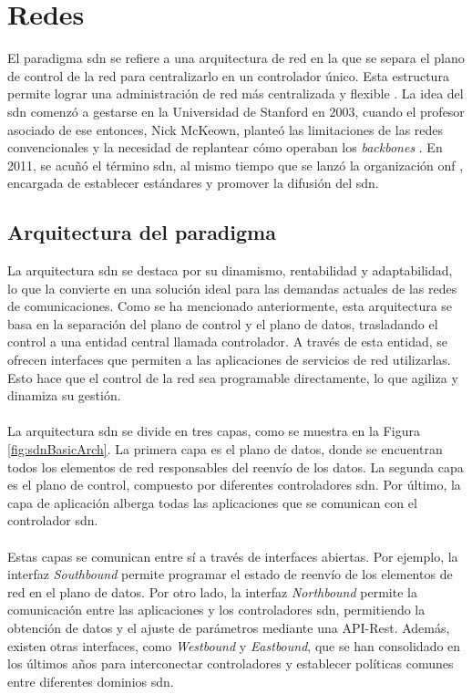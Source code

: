 \section{Redes  }
\label{sec:sdn}


El paradigma \gls{sdn} \cite{nadeau2013sdn} se refiere a una arquitectura de red en la que se separa el plano de control de la red para centralizarlo en un controlador único. Esta estructura permite lograr una administración de red más centralizada y flexible \cite{nadeau2013sdn}. La idea del \gls{sdn} comenzó a gestarse en la Universidad de Stanford en 2003, cuando el profesor asociado de ese entonces, Nick McKeown, planteó las limitaciones de las redes convencionales y la necesidad de replantear cómo operaban los \textit{backbones} \cite{sdnBegins}. En 2011, se acuñó el término \gls{sdn}, al mismo tiempo que se lanzó la organización \gls{onf} \cite{onf}, encargada de establecer estándares y promover la difusión del \gls{sdn}.

\subsection{Arquitectura del paradigma }

La arquitectura \gls{sdn} se destaca por su dinamismo, rentabilidad y adaptabilidad, lo que la convierte en una solución ideal para las demandas actuales de las redes de comunicaciones. Como se ha mencionado anteriormente, esta arquitectura se basa en la separación del plano de control y el plano de datos, trasladando el control a una entidad central llamada controlador. A través de esta entidad, se ofrecen interfaces que permiten a las aplicaciones de servicios de red utilizarlas. Esto hace que el control de la red sea programable directamente, lo que agiliza y dinamiza su gestión.\\
\\
La arquitectura \gls{sdn} se divide en tres capas, como se muestra en la Figura \ref{fig:sdnBasicArch}. La primera capa es el plano de datos, donde se encuentran todos los elementos de red responsables del reenvío de los datos. La segunda capa es el plano de control, compuesto por diferentes controladores \gls{sdn}. Por último, la capa de aplicación alberga todas las aplicaciones que se comunican con el controlador \gls{sdn}.\\
\\
Estas capas se comunican entre sí a través de interfaces abiertas. Por ejemplo, la interfaz \textit{Southbound} permite programar el estado de reenvío de los elementos de red en el plano de datos. Por otro lado, la interfaz \textit{Northbound} permite la comunicación entre las aplicaciones y los controladores \gls{sdn}, permitiendo la obtención de datos y el ajuste de parámetros mediante una API-Rest. Además, existen otras interfaces, como \textit{Westbound} y \textit{Eastbound}, que se han consolidado en los últimos años para interconectar controladores y establecer políticas comunes entre diferentes dominios \gls{sdn}.\\


